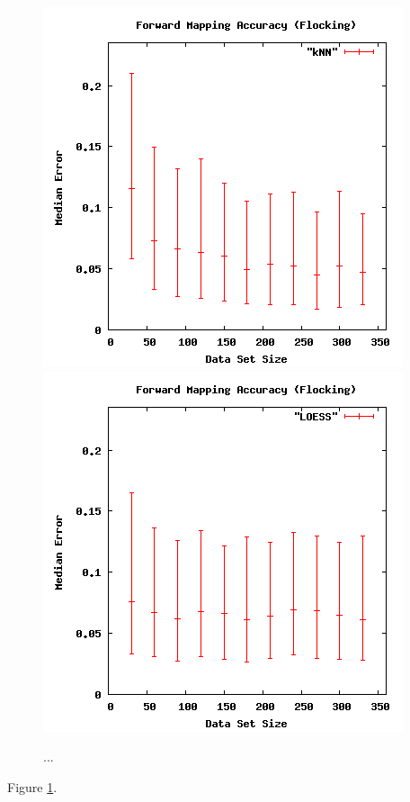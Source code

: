 \begin{figure}[ht]
\centering
\includegraphics[scale=.4]{images/results_flocking/fmacc-kNN.png}
\includegraphics[scale=.4]{images/results_flocking/fmacc-LOESS.png}
\caption{...}
\label{fig:flockfmacc}
\end{figure}

Figure \ref{fig:flockfmacc}.

